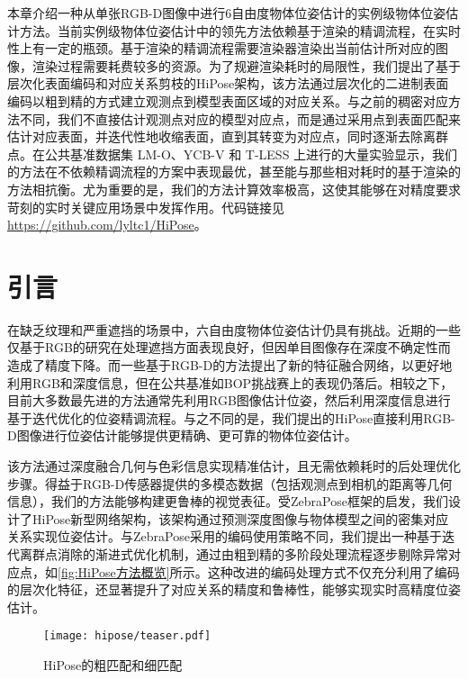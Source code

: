 本章介绍一种从单张RGB-D图像中进行6自由度物体位姿估计的实例级物体位姿估计方法。当前实例级物体位姿估计中的领先方法\cite{Sundermeyer2023BOPC2}依赖基于渲染的精调流程，在实时性上有一定的瓶颈。基于渲染的精调流程需要渲染器渲染出当前估计所对应的图像，渲染过程需要耗费较多的资源。为了规避渲染耗时的局限性，我们提出了基于层次化表面编码和对应关系剪枝的HiPose架构，该方法通过层次化的二进制表面编码以粗到精的方式建立观测点到模型表面区域的对应关系。与之前的稠密对应方法不同，我们不直接估计观测点对应的模型对应点，而是通过采用点到表面匹配来估计对应表面，并迭代性地收缩表面，直到其转变为对应点，同时逐渐去除离群点。在公共基准数据集 LM-O、YCB-V 和 T-LESS 上进行的大量实验显示，我们的方法在不依赖精调流程的方案中表现最优，甚至能与那些相对耗时的基于渲染的方法相抗衡。尤为重要的是，我们的方法计算效率极高，这使其能够在对精度要求苛刻的实时关键应用场景中发挥作用。代码链接见 \url{https://github.com/lyltc1/HiPose}。

\section{引言}
在缺乏纹理和严重遮挡的场景中，六自由度物体位姿估计仍具有挑战。近期的一些仅基于RGB的研究\cite{su2022zebrapose}在处理遮挡方面表现良好，但因单目图像存在深度不确定性而造成了精度下降。而一些基于RGB-D的方法\cite{wang2019densefusion,he2020pvn3d,he2021ffb6d,zhou2023deep}提出了新的特征融合网络，以更好地利用RGB和深度信息，但在公共基准如BOP挑战赛\cite{Sundermeyer2023BOPC2}上的表现仍落后。相较之下，目前大多数最先进的方法通常先利用RGB图像估计位姿，然后利用深度信息进行基于迭代优化的位姿精调流程\cite{Rusinkiewicz2001EfficientVO,lipson2022coupled}。与之不同的是，我们提出的HiPose直接利用RGB-D图像进行位姿估计能够提供更精确、更可靠的物体位姿估计。

该方法通过深度融合几何与色彩信息实现精准估计，且无需依赖耗时的后处理优化步骤。得益于RGB-D传感器提供的多模态数据（包括观测点到相机的距离等几何信息），我们的方法能够构建更鲁棒的视觉表征。受ZebraPose\cite{su2022zebrapose}框架的启发，我们设计了HiPose新型网络架构，该架构通过预测深度图像与物体模型之间的密集对应关系实现位姿估计。与ZebraPose采用的编码使用策略不同，我们提出一种基于迭代离群点消除的渐进式优化机制，通过由粗到精的多阶段处理流程逐步剔除异常对应点，如\autoref{fig:HiPose方法概览}所示。这种改进的编码处理方式不仅充分利用了编码的层次化特征，还显著提升了对应关系的精度和鲁棒性，能够实现实时高精度位姿估计。

\begin{figure}[ht]
    \centering
    \texttt{[image: hipose/teaser.pdf]}
    \caption{HiPose的粗匹配和细匹配}
    \label{fig:HiPose方法概览}
\end{figure}

